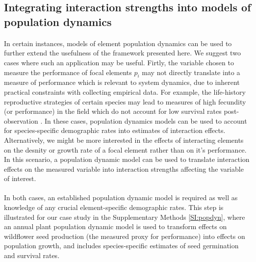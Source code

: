 \documentclass[a4,12pt]{article}
\begin{document}
    \subsection{Integrating interaction strengths into models of population dynamics}

        \paragraph{}
        In certain instances, models of element population dynamics can be used to further extend the usefulness of the framework presented here. We suggest two cases where such an application may be useful. Firtly, the variable chosen to measure the performance of focal elements $p_i$ may not directly translate into a measure of performance which is relevant to system dynamics,  due to inherent practical constraints with collecting empirical data. For example, the life-history reproductive strategies of certain species may lead to measures of high fecundity (or performance) in the field which do not account for low survival rates post-observation \parencite{Broekman2020}. In these cases, population dynamics models can be used to account for species-specific demographic rates into estimates of interaction effects. Alternatively, we might be more interested in the effects of interacting elements on the desnity or growth rate of a focal element rather than on it's performance. In this scenario, a population dynamic model can be used to translate interaction effects on the measured variable into interaction strengths affecting the variable of interest. 

        \paragraph{}
        In both cases, an established population dynamic model is required as well as knowledge of any crucial element-specific demographic rates. This step is illustrated for our case study in the Supplementary Methods \ref{SI:popdyn}, where an annual plant population dynamic model is used to transform effects on wildflower seed production (the measured proxy for performance) into effects on population growth, and includes species-specific estimates of seed germination and survival rates. 

\end{document}
